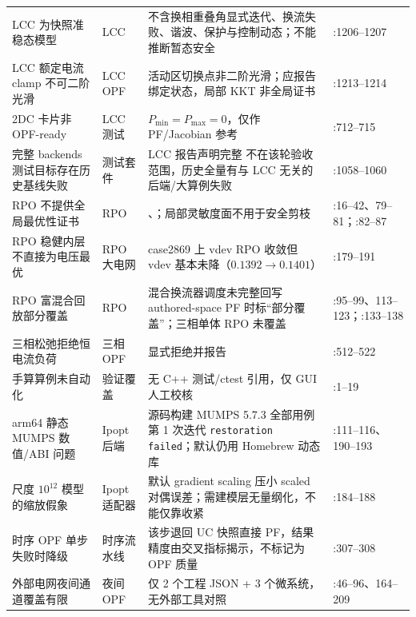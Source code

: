 \begin{footnotesize}
\begin{longtable}{@{}L{4.2cm}L{1.9cm}L{5.2cm}L{4.0cm}@{}}
LCC 为快照准稳态模型 &
LCC &
不含换相重叠角显式迭代、换流失败、谐波、保护与控制动态；不能推断暂态安全 &
:1206--1207\\
LCC 额定电流 clamp 不可二阶光滑 &
LCC OPF &
活动区切换点非二阶光滑；应报告绑定状态，局部 KKT 非全局证书 &
:1213--1214\\
2DC 卡片非 OPF-ready &
LCC 测试 &
$P_{\min}=P_{\max}=0$，仅作 PF/Jacobian 参考 &
:712--715\\
完整 backends 测试目标存在历史基线失败 &
测试套件 &
LCC 报告声明完整  不在该轮验收范围，历史全量有与 LCC 无关的后端/大算例失败 &
:1058--1060\\
RPO 不提供全局最优性证书 &
RPO &
、；局部灵敏度面不用于安全剪枝 &
:16--42、79--81；:82--87\\
RPO 稳健内层不直接为电压最优 &
RPO 大电网 &
case2869 上 vdev RPO 收敛但 vdev 基本未降（$0.1392\to0.1401$） &
:179--191\\
RPO 富混合回放部分覆盖 &
RPO &
混合换流器调度未完整回写 authored-space PF 时标“部分覆盖”；三相单体 RPO 未覆盖 &
:95--99、113--123；:133--138\\
三相松弛拒绝恒电流负荷 &
三相 OPF &
 显式拒绝并报告  &
:512--522\\
手算算例未自动化 &
验证覆盖 &
 无 C++ 测试/ctest 引用，仅 GUI 人工校核 &
:1--19\\
arm64 静态 MUMPS 数值/ABI 问题 &
Ipopt 后端 &
源码构建 MUMPS 5.7.3 全部用例第 1 次迭代 \texttt{restoration failed}；默认仍用 Homebrew 动态库 &
:111--116、190--193\\
尺度 $10^{12}$ 模型的缩放假象 &
Ipopt 适配器 &
默认 gradient scaling 压小 scaled 对偶误差；需建模层无量纲化，不能仅靠收紧  &
:184--188\\
时序 OPF 单步失败时降级 &
时序流水线 &
该步退回 UC 快照直接 PF，结果精度由交叉指标揭示，不标记为 OPF 质量 &
:307--308\\
外部电网夜间通道覆盖有限 &
夜间 OPF &
仅 2 个工程 JSON + 3 个微系统，无外部工具对照 &
:46--96、164--209\\
\end{longtable}
\end{footnotesize}

